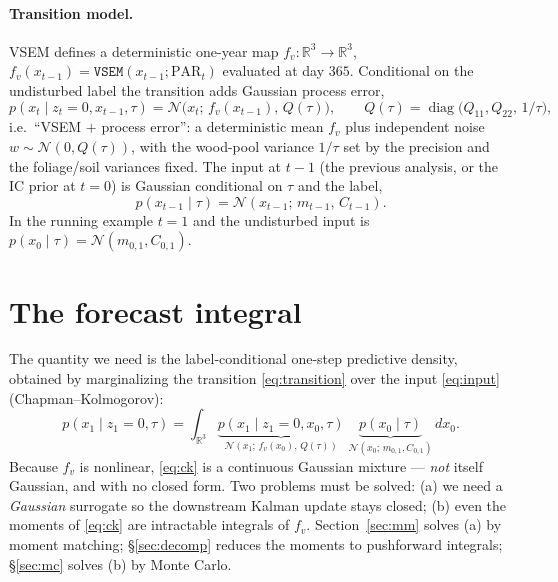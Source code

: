 \documentclass[11pt]{article}
\newcommand{\code}[1]{\texttt{#1}}
\newcommand{\R}{\mathbb{R}}
\newcommand{\Norm}{\mathcal{N}}
\DeclareMathOperator{\diag}{diag}
\begin{document}
\paragraph{Transition model.} VSEM defines a deterministic one-year map
$f_v:\R^3\to\R^3$, $f_v(x_{t-1})=\code{VSEM}(x_{t-1};\text{PAR}_t)$ evaluated at day $365$.
Conditional on the undisturbed label the transition adds Gaussian process error,
\begin{equation}
\label{eq:transition}
p(x_t\mid z_t{=}0,x_{t-1},\tau)=\Norm\!\big(x_t;\,f_v(x_{t-1}),\,Q(\tau)\big),
\qquad Q(\tau)=\diag\!\big(Q_{11},Q_{22},\,1/\tau\big),
\end{equation}
i.e.\ ``VSEM $+$ process error'': a deterministic mean $f_v$ plus independent noise
$w\sim\Norm(0,Q(\tau))$, with the wood-pool variance $1/\tau$ set by the precision and the
foliage/soil variances fixed. The input at $t-1$ (the previous analysis, or the IC prior
at $t=0$) is Gaussian conditional on $\tau$ and the label,
\begin{equation}
\label{eq:input}
p(x_{t-1}\mid\tau)=\Norm(x_{t-1};\,m_{t-1},\,C_{t-1}).
\end{equation}
In the running example $t=1$ and the undisturbed input is $p(x_0\mid\tau)=\Norm(m_{0,1},C_{0,1})$.

\section{The forecast integral}
\label{sec:integral}

The quantity we need is the label-conditional one-step predictive density, obtained by
marginalizing the transition \eqref{eq:transition} over the input \eqref{eq:input}
(Chapman--Kolmogorov):
\begin{equation}
\label{eq:ck}
p(x_1\mid z_1{=}0,\tau)
=\int_{\R^3} \underbrace{p(x_1\mid z_1{=}0,x_0,\tau)}_{\Norm(x_1;\,f_v(x_0),\,Q(\tau))}\;
             \underbrace{p(x_0\mid\tau)}_{\Norm(x_0;\,m_{0,1},C_{0,1})}\,dx_0 .
\end{equation}
Because $f_v$ is nonlinear, \eqref{eq:ck} is a continuous Gaussian mixture --- \emph{not}
itself Gaussian, and with no closed form. Two problems must be solved: (a) we need a
\emph{Gaussian} surrogate so the downstream Kalman update stays closed; (b) even the
moments of \eqref{eq:ck} are intractable integrals of $f_v$. Section~\ref{sec:mm} solves
(a) by moment matching; \S\ref{sec:decomp} reduces the moments to pushforward integrals;
\S\ref{sec:mc} solves (b) by Monte Carlo.
\end{document}
